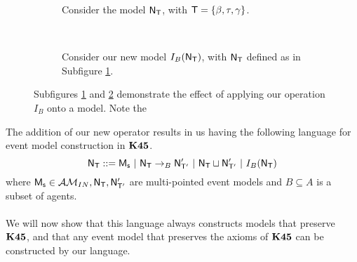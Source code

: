 \begin{figure}[ht!]
\centering
\begin{subfigure}[b]{.45\textwidth}
\centering
{}
\caption{Consider the model $\mathrm{\mathsf{N}}_\mathrm{\mathsf{T}}$, with $\mathrm{\mathsf{T}} = \{\beta, \tau, \gamma\}$.}
\label{beforeOperation}
\end{subfigure}
~
\begin{subfigure}[b]{.45\textwidth}
\centering
{}
\caption{Consider our new model $I_B(\mathrm{\mathsf{N}}_\mathrm{\mathsf{T}})$, with $\mathrm{\mathsf{N}}_\mathrm{\mathsf{T}}$ defined as in Subfigure
\ref{beforeOperation}.}
\label{afterOperation}
\end{subfigure}
\caption{Subfigures \ref{beforeOperation} and \ref{afterOperation} demonstrate the effect of
applying our operation $I_B$ onto a model.
Note the }
\label{k45VsKModels}
\end{figure}

The addition of our new operator results in us having the following language for
event model construction in $\bf K45$.
\[
	\mathrm{\mathsf{N}}_\mathrm{\mathsf{T}} ::= \mathrm{\mathsf{M_s}} \text{ } | \text{ }\mathrm{\mathsf{N}}_\mathrm{\mathsf{T}} \to_B \mathrm{\mathsf{N}}'_{\mathrm{\mathsf{T}}'} \text{ }|
  \text{ } \mathrm{\mathsf{N}}_\mathrm{\mathsf{T}} \sqcup \mathrm{\mathsf{N}}'_{\mathrm{\mathsf{T}}'} \text{ } | \text{ } I_B(\mathrm{\mathsf{N}}_\mathrm{\mathsf{T}})
\]
where $\mathrm{\mathsf{M_s}} \in \mathcal{AM}_{IN}, \mathrm{\mathsf{N}}_\mathrm{\mathsf{T}}, \mathrm{\mathsf{N}}'_{\mathrm{\mathsf{T}}'}$ are multi-pointed event models and $B \subseteq
A$ is a subset of agents.\\
\\
We will now show that this language always constructs models that preserve $\bf K45$, and that any
event model that preserves the axioms of $\bf K45$ can be constructed by our language.

